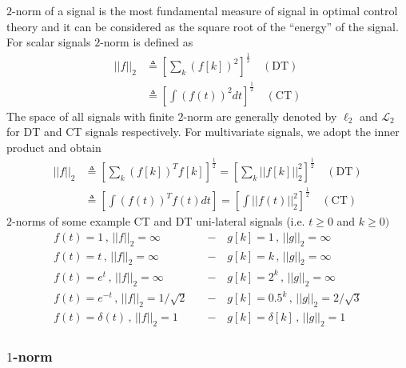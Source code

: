 \documentclass[twoside]{article}
\begin{document}
$2$-norm of a signal is the most fundamental measure of signal in optimal control theory and it can be
considered as the square root of the ``energy'' of the signal. For scalar signals $2$-norm is defined as
%
\begin{align*}
	|| f ||_{2} &\triangleq \left[ \sum\limits_k (f[k])^2 \right]^{\frac{1}{2}} \quad (\mathrm{DT})
	\\
	&\triangleq \left[ \int\limits ( f(t) )^2 dt \right]^{\frac{1}{2}}  \quad (\mathrm{CT})
\end{align*}
%
The space of all signals with finite $2$-norm are generally denoted by 
$\ell_{2}$ and $\mathcal{L}_{2}$ for DT and CT signals respectively.
For multivariate signals, we adopt the inner product and obtain
%
\begin{align*}
	|| f ||_{2} &\triangleq \left[ \sum\limits_k (f[k])^T f[k] \right]^{\frac{1}{2}} = 
	\left[ \sum\limits_k || f[k] ||_2^2 \right]^{\frac{1}{2}} 
	\quad (\mathrm{DT})
	\\
	&\triangleq \left[ \int\limits (f(t))^T f(t)  dt \right]  = 
	\left[ \int\limits || f(t) ||_2^2 \right]^{\frac{1}{2}} 
	\quad (\mathrm{CT})
\end{align*}
%
$2$-norms of some example CT and DT uni-lateral signals (i.e. $t \geq 0$
and $k \geq 0)$
%
\begin{align*}
	f(t) = 1 \, , \, || f ||_{2} = \infty  \quad &- \quad g[k] = 1 \, , \, || g ||_{2} = \infty
	\\
	f(t) = t \, , \, || f ||_{2} = \infty \quad &- \quad g[k] = k \, , \, || g ||_{2} = \infty
		\\
	f(t) = e^t \, , \, || f ||_{2} = \infty \quad &- \quad g[k] = 2^k \, , \, || g ||_{2} = \infty
			\\
	f(t) = e^{-t} \, , \, || f ||_{2} = 1/\sqrt{2} \quad &- \quad g[k] = 0.5^k \, , \, || g ||_{2} = 2/\sqrt{3}
				\\
	f(t) = \delta(t) \, , \, || f ||_{2} = 1 \quad &- \quad g[k] = \delta[k] \, , \, || g ||_{2} = 1
\end{align*}

\subsubsection*{$1$-norm}
\end{document}
